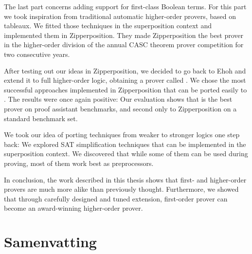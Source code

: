 The last part concerns adding support for
first-class Boolean terms. For this part we took inspiration from traditional
automatic higher-order provers, based on tableaux. We fitted those techniques in the
superposition context and implemented them in Zipperposition. They
made Zipperposition the best prover in the higher-order division of the annual CASC
theorem prover competition for two consecutive years.

After testing out our ideas in Zipperposition, we decided to go back to Ehoh and
extend it to full higher-order logic, obtaining a prover called \ehohii{}. We
chose the most successful approaches implemented in Zipperposition that can
be ported easily to \ehohii{}. The results were once again positive: Our
evaluation shows that \ehohii{} is the best prover on proof assistant
benchmarks, and second only to Zipperposition on a standard benchmark set.

We took our idea of porting techniques from weaker to stronger logics one step
back: We explored SAT simplification techniques that can be implemented in the
superposition context. We discovered that while some of them can be used during proving,
most of them work best as preprocessors.

In conclusion, the work described in this thesis shows that first- and
higher-order provers are much more alike than previously thought. Furthermore,
we showed that through carefully designed and tuned extension, first-order
prover can become an award-winning higher-order prover.

\chapter*{Samenvatting}

{


}



